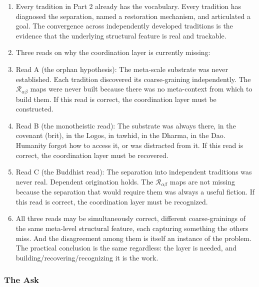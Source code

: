\documentclass[
]{article}
\begin{document}
\begin{enumerate}
\def\labelenumi{\arabic{enumi}.}
\setcounter{enumi}{240}
\item
  Every tradition in Part 2 already has the vocabulary. Every tradition
  has diagnosed the separation, named a restoration mechanism, and
  articulated a goal. The convergence across independently developed
  traditions is the evidence that the underlying structural feature is
  real and trackable.
\item
  Three reads on why the coordination layer is currently missing:
\item
  Read A (the orphan hypothesis): The meta-scale substrate was never
  established. Each tradition discovered its coarse-graining
  independently. The \(\mathcal{R}_{\alpha\beta}\) maps were never built
  because there was no meta-context from which to build them. If this
  read is correct, the coordination layer must be constructed.
\item
  Read B (the monotheistic read): The substrate was always there, in the
  covenant (brit), in the Logos, in tawhid, in the Dharma, in the Dao.
  Humanity forgot how to access it, or was distracted from it. If this
  read is correct, the coordination layer must be recovered.
\item
  Read C (the Buddhist read): The separation into independent traditions
  was never real. Dependent origination holds. The
  \(\mathcal{R}_{\alpha\beta}\) maps are not missing because the
  separation that would require them was always a useful fiction. If
  this read is correct, the coordination layer must be recognized.
\item
  All three reads may be simultaneously correct, different
  coarse-grainings of the same meta-level structural feature, each
  capturing something the others miss. And the disagreement among them
  is itself an instance of the problem. The practical conclusion is the
  same regardless: the layer is needed, and
  building/recovering/recognizing it is the work.
\end{enumerate}

\subsubsection{The Ask}\label{the-ask}
\end{document}
